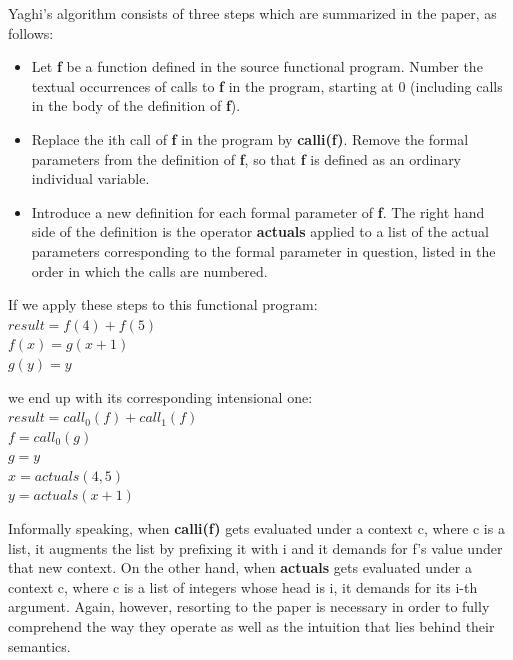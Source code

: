 \documentclass[ack,preface]{dithesis}
\begin{document}
Yaghi's algorithm consists of three steps which are summarized in the paper, as follows:

    \begin{itemize}
    \item Let \textbf{f} be a function defined in the source functional program. Number the textual occurrences of calls to \textbf{f} in the program, starting at 0 (including calls in the body of the definition of \textbf{f}).
   
   \item Replace the ith call of \textbf{f} in the program by \textbf{calli(f)}. Remove the formal parameters from the definition of \textbf{f}, so that \textbf{f} is defined as an ordinary individual variable.
   
   \item Introduce a new definition for each formal parameter of \textbf{f}. The right hand side of the definition is the operator \textbf{actuals} applied to a list of the actual parameters corresponding to the formal parameter in question, listed in the order in which the calls are numbered.
    \end{itemize}


\begin{flushleft}
If we apply these steps to this functional program:\\
 \setlength{\parindent}{25ex} $result = f(4) + f(5)$ \\
$f(x) = g(x+1)$ \\ 
$g(y) = y$
\end{flushleft}

\begin{flushleft}
we end up with its corresponding intensional one:\\
 \setlength{\parindent}{25ex} $result = call_0(f) + call_1(f)$ \\
$f = call_0(g)$ \\ 
$g = y$ \\
$x = actuals(4,5)$ \\
$y = actuals(x+1)$ \\
\end{flushleft}

Informally speaking, when \textbf{calli(f)} gets evaluated under a context c, where c is  a list, it augments the list by prefixing it with i and it demands for f's value under that new context.  On the other hand, when \textbf{actuals} gets evaluated under a context c, where c is a list of  integers whose head is i, it demands for  its  i-th argument. Again, however, resorting to the paper is necessary in order to fully comprehend the way they operate as well as the intuition that lies behind their semantics.
\end{document}
